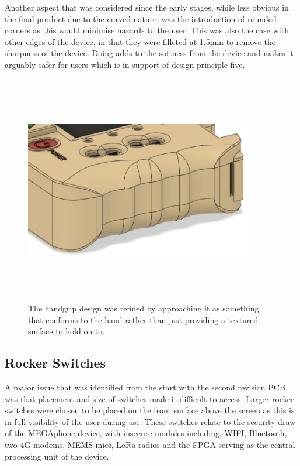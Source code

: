 Another aspect that was considered since the early stages, while less obvious in the final product due to the curved nature, was the introduction of rounded corners as this would minimise hazards to the user.
This was also the case with other edges of the device, in that they were filleted at 1.5mm to remove the sharpness of the device.
Doing adds to the softness from the device and makes it arguably safer for users which is in support of design principle five.

\begin{figure} [h]
    \centering
    \includegraphics[width=10cm,height=10cm,keepaspectratio]{Figures/handgrip_final.png}
    \caption{The handgrip design was refined by approaching it as something that conforms to the hand rather than just providing a textured surface to hold on to.}
    \label{fig:Design_3}
\end{figure}

\subsection{Rocker Switches}

A major issue that was identified from the start with the second revision PCB was that placement and size of switches made it difficult to access.
Larger rocker switches were chosen to be placed on the front surface above the screen as this is in full visibility of the user during use.
These switches relate to the security draw of the MEGAphone device, with insecure modules including, WIFI, Bluetooth, two 4G modems, MEMS mics, LoRa radios and the FPGA serving as the central processing unit of the device.

